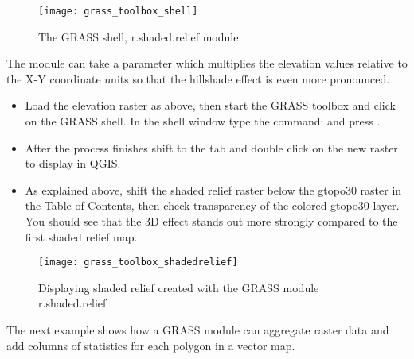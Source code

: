 \begin{figure}[ht]
 \centering
 \texttt{[image: grass\_toolbox\_shell]}
 \caption{The GRASS shell, r.shaded.relief module \nixcaption}\label{fig:grass_toolbox_shell}
\end{figure}

The module  can take a parameter 
which multiplies the elevation values relative to the X-Y coordinate units so
that the hillshade effect is even more pronounced.

\begin{itemize}[label=--]
\item Load the  elevation raster as above, then start the
GRASS toolbox and click on the GRASS shell. In the shell window type the
command:\linebreak
{} \linebreak and press .
\end{itemize}

\begin{itemize}[label=--]
\item After the process finishes shift to the  tab and double click on
the new  raster to display in QGIS.
\item As explained above, shift the shaded relief raster below the gtopo30
raster in the Table of Contents, then check transparency of the colored
gtopo30 layer. You should see that the 3D effect stands out more strongly
compared to the first shaded relief map.
\end{itemize}

\begin{figure}[ht]
 \centering
 \texttt{[image: grass\_toolbox\_shadedrelief]}
 \caption{Displaying shaded relief created with the GRASS module
r.shaded.relief \nixcaption}\label{fig:grass_toolbox_shadedrelief}
\end{figure}


The next example shows how a GRASS module can aggregate raster data and add
columns of statistics for each polygon in a vector map.

